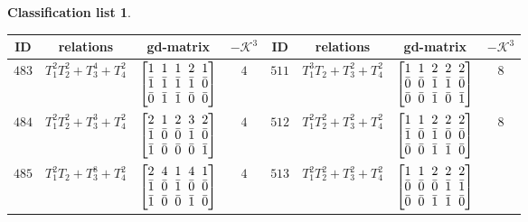 \documentclass[pdftex]{sigma}%
\theoremstyle{definition}
\newtheorem{class-list}[thm]{Classification list}
\numberwithin{equation}{section}
\begin{document}
\begin{class-list}
\begin{table}[t!]\centering\setlength{\tabcolsep}{3.5pt}
\renewcommand{\arraystretch}{1.05}\small\tabulinesep=1mm
\begin{tabu}{c|c|c|c||c|c|c|c}
\hline
ID&relations&gd-matrix&$-\mathcal{K}^3$&ID&relations&gd-matrix&$-\mathcal{K}^3$
\\
\hline
${483}$&${T_{1}^{2}T_{2}^{2}+T_{3}^{4}+T_{4}^{2}}$
&$\arraycolsep=1mm\begin{bmatrix}{1} & {1} & {1} & {2} & {1} \\ {\bar{1}} & {\bar{1}} & {\bar{1}} & {\bar{1}} & {\bar{0}} \\ {\bar{0}} & {\bar{1}} & {\bar{1}} & {\bar{0}} & {\bar{0}}\end{bmatrix}$
&${4}$
&${511}$&${T_{1}^{3}T_{2}+T_{3}^{2}+T_{4}^{2}}$
&$\arraycolsep=1mm\begin{bmatrix}{1} & {1} & {2} & {2} & {2} \\ {\bar{0}} & {\bar{0}} & {\bar{1}} & {\bar{1}} & {\bar{0}} \\ {\bar{0}} & {\bar{0}} & {\bar{1}} & {\bar{0}} & {\bar{1}}\end{bmatrix}$
&${8}$
\\
\hline
${484}$&${T_{1}^{2}T_{2}^{2}+T_{3}^{3}+T_{4}^{2}}$
&$\arraycolsep=1mm\begin{bmatrix}{2} & {1} & {2} & {3} & {2} \\ {\bar{1}} & {\bar{0}} & {\bar{0}} & {\bar{1}} & {\bar{0}} \\ {\bar{1}} & {\bar{0}} & {\bar{0}} & {\bar{0}} & {\bar{1}}\end{bmatrix}$
&${4}$
&${512}$&${T_{1}^{2}T_{2}^{2}+T_{3}^{2}+T_{4}^{2}}$
&$\arraycolsep=1mm\begin{bmatrix}{1} & {1} & {2} & {2} & {2} \\ {\bar{1}} & {\bar{0}} & {\bar{1}} & {\bar{0}} & {\bar{0}} \\ {\bar{0}} & {\bar{0}} & {\bar{1}} & {\bar{1}} & {\bar{0}}\end{bmatrix}$
&${8}$
\\
\hline
${485}$&${T_{1}^{2}T_{2}+T_{3}^{8}+T_{4}^{2}}$
&$\arraycolsep=1mm\begin{bmatrix}{2} & {4} & {1} & {4} & {1} \\ {\bar{1}} & {\bar{0}} & {\bar{1}} & {\bar{0}} & {\bar{0}} \\ {\bar{1}} & {\bar{0}} & {\bar{0}} & {\bar{1}} & {\bar{0}}\end{bmatrix}$
&${4}$
&${513}$&${T_{1}^{2}T_{2}^{2}+T_{3}^{2}+T_{4}^{2}}$
&$\arraycolsep=1mm\begin{bmatrix}{1} & {1} & {2} & {2} & {2} \\ {\bar{0}} & {\bar{0}} & {\bar{0}} & {\bar{1}} & {\bar{1}} \\ {\bar{0}} & {\bar{0}} & {\bar{1}} & {\bar{1}} & {\bar{0}}\end{bmatrix}$

\end{tabu}
\end{table}
\end{class-list}
\end{document}
